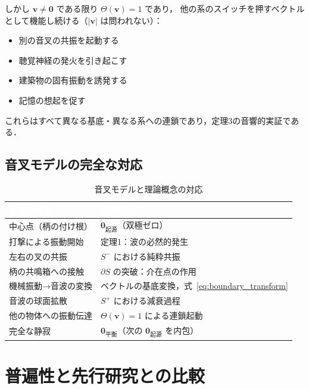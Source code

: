 \documentclass[12pt, a4paper]{article}
\theoremstyle{definition}
\newcommand{\vzero}{\mathbf{0}}
\newcommand{\vorigin}{\mathbf{0}_{\text{起源}}}
\newcommand{\vequil}{\mathbf{0}_{\text{平衡}}}
\newcommand{\Switch}{\Theta}
\begin{document}
しかし $\mathbf{v} \neq \vzero$ である限り $\Switch(\mathbf{v}) = 1$ であり，
他の系のスイッチを押すベクトルとして機能し続ける（$|\mathbf{v}|$ は問われない）：

\begin{itemize}
  \item 別の音叉の共振を起動する
  \item 聴覚神経の発火を引き起こす
  \item 建築物の固有振動を誘発する
  \item 記憶の想起を促す
\end{itemize}

これらはすべて異なる基底・異なる系への連鎖であり，定理3の音響的実証である．

\subsection{音叉モデルの完全な対応}

\begin{table}[h!]
  \centering
  \caption{音叉モデルと理論概念の対応}
  \vspace{0.3em}
  \renewcommand{\arraystretch}{1.3}
  \begin{tabularx}{\textwidth}{lX}
    \toprule
    \rowcolor{headerblue}
    \textcolor{white}{\textbf{音叉の現象}} &
    \textcolor{white}{\textbf{理論的対応}} \\
    \midrule
    中心点（柄の付け根） & $\vorigin$（双極ゼロ） \\
    打撃による振動開始   & 定理1：波の必然的発生 \\
    左右の叉の共振       & $S^-$ における純粋共振 \\
    柄の共鳴箱への接触   & $\partial S$ の突破：介在点の作用 \\
    機械振動→音波の変換  & ベクトルの基底変換，式~\eqref{eq:boundary_transform} \\
    音波の球面拡散       & $S^+$ における減衰過程 \\
    他の物体への振動伝達 & $\Switch(\mathbf{v})=1$ による連鎖起動 \\
    完全な静寂           & $\vequil$（次の $\vorigin$ を内包） \\
    \bottomrule
  \end{tabularx}
  \label{tab:tuning_fork}
\end{table}

\section{普遍性と先行研究との比較}
\end{document}
